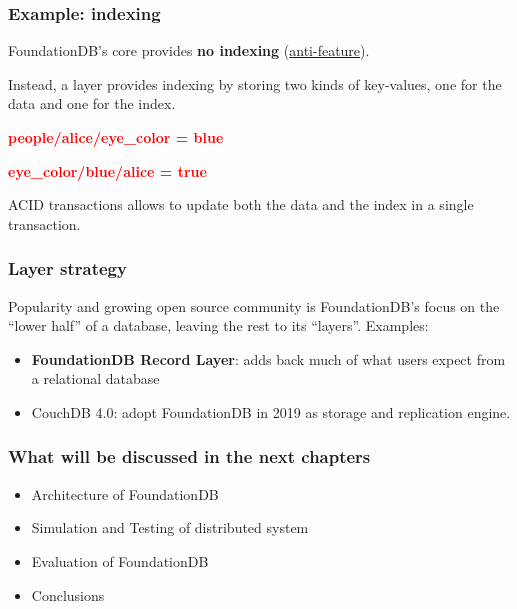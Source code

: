 
\begin{frame}
	\frametitle{Example: indexing}

FoundationDB’s core provides \textbf{no indexing}  (\href{https://apple.github.io/foundationdb/anti-features.html}{anti-feature}).

Instead, a layer provides indexing by storing two kinds of key-values, one for the data and one for the index.

\begin{center}
\textbf{\textcolor{red}{people/alice/eye\_color = blue}}
\end{center}

\begin{center}
\textbf{\textcolor{red}{eye\_color/blue/alice = true}}
\end{center}

ACID transactions allows to update both the data and the index in a single transaction.
\end{frame}


\begin{frame}
	\frametitle{Layer strategy}

Popularity and growing open source community is FoundationDB’s focus on the “lower
half” of a database, leaving the rest to its “layers”.
\vspace{0.5cm}
Examples:
\begin{itemize}
    \item \textbf{FoundationDB Record Layer}: adds back much of what users expect from a relational database
    \item CouchDB 4.0: adopt FoundationDB in 2019 as storage and replication engine.
\end{itemize}
\end{frame}



\begin{frame}
	\frametitle{What will be discussed in the next chapters}

    \begin{itemize}
        \item Architecture of FoundationDB
        \item Simulation and Testing of distributed system
        \item Evaluation of FoundationDB
        \item Conclusions
    \end{itemize}
        
\end{frame}


